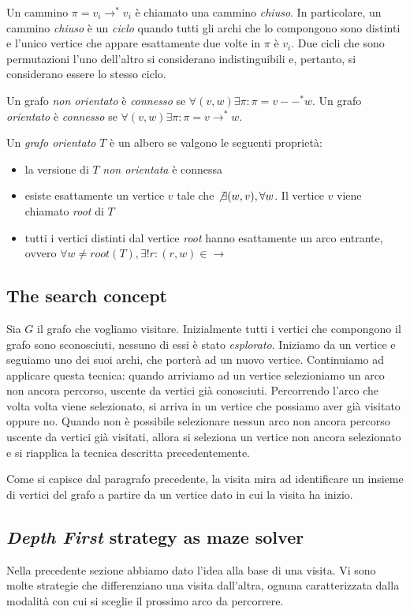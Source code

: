 Un cammino $\pi = v_{i} \rightarrow^{*} v_{i}$ \`e chiamato una
cammino \emph{chiuso}. In particolare, un cammino \emph{chiuso} \`e un
\emph{ciclo} quando tutti gli archi che lo compongono sono distinti e
l'unico vertice che appare esattamente due volte in $\pi$ \`e
$v_{i}$. Due cicli che sono permutazioni l'uno dell'altro si
considerano indistinguibili e, pertanto, si considerano essere lo
stesso ciclo.

Un grafo \emph{non orientato} \`e \emph{connesso} se $\forall (v, w)
\exists \pi: \pi = v --^{*} w$. Un grafo \emph{orientato} \`e
\emph{connesso} se $\forall (v, w) \exists \pi: \pi = v
\rightarrow^{*} w$.

Un \emph{grafo orientato} $T$ \`e un albero se valgono le seguenti
propriet\`a:
\begin{itemize}
\item la versione di $T$ \emph{non orientata} \`e connessa
\item esiste esattamente un vertice $v$ tale che $\not \exists (w, v),
  \forall w$. Il vertice $v$ viene chiamato \emph{root} di $T$
\item tutti i vertici distinti dal vertice \emph{root} hanno
  esattamente un arco entrante, ovvero $\forall w \not = root(T),
  \exists!r: (r, w) \in \rightarrow$
\end{itemize}

\subsection{The search concept}
Sia $G$ il grafo che vogliamo visitare. Inizialmente tutti i vertici
che compongono il grafo sono sconosciuti, nessuno di essi \`e stato
\emph{esplorato}. Iniziamo da un vertice e seguiamo uno dei suoi
archi, che porter\`a ad un nuovo vertice. Continuiamo ad applicare
questa tecnica: quando arriviamo ad un vertice selezioniamo un arco
non ancora percorso, uscente da vertici gi\`a conosciuti. Percorrendo
l'arco che volta volta viene selezionato, si arriva in un vertice che
possiamo aver gi\`a visitato oppure no. Quando non \`e possibile
selezionare nessun arco non ancora percorso uscente da vertici gi\`a
visitati, allora si seleziona un vertice non ancora selezionato e si
riapplica la tecnica descritta precedentemente.

Come si capisce dal paragrafo precedente, la visita mira ad
identificare un insieme di vertici del grafo a partire da un vertice
dato in cui la visita ha inizio.

\subsection{\emph{Depth First} strategy as maze solver}
Nella precedente sezione abbiamo dato l'idea alla base di una
visita. Vi sono molte strategie che differenziano una visita
dall'altra, ognuna caratterizzata dalla modalit\`a con cui si sceglie
il prossimo arco da percorrere.

